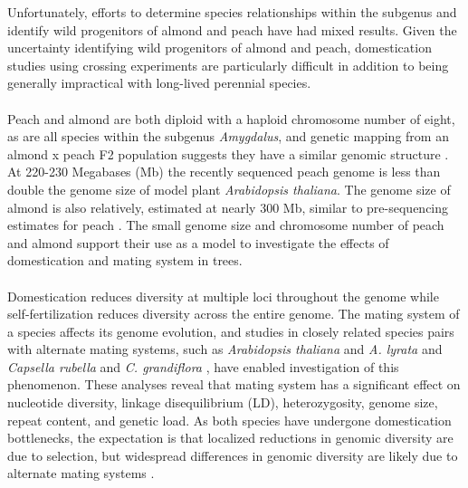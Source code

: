 \documentclass[12pt]{article}
\begin{document}
%
Unfortunately, efforts to determine species relationships within the subgenus and identify wild progenitors of almond and peach \citep{verde2013high, aradhya2004molecular, zeinalabedini2010origin, mowrey1990isozyme, browicz1996genus, ladizinsky1999origin, bassi20081} have had mixed results. 
%
Given the uncertainty identifying wild progenitors of almond and peach, domestication studies using crossing experiments are particularly difficult in addition to being generally impractical with long-lived perennial species.
%
\\
\\
Peach and almond are both diploid with a haploid chromosome number of eight, as are all species within the subgenus \emph{Amygdalus}, and genetic mapping from an almond x peach F2 population suggests they have a similar genomic structure \citep{dirlewanger2004comparative}. 
%
At 220-230 Megabases (Mb) the recently sequenced peach genome \citep{verde2013high} is less than double the genome size of model plant \emph{Arabidopsis thaliana}.
%
The genome size of almond is also relatively, estimated at  nearly 300 Mb, similar to pre-sequencing estimates for peach \citep{arumuganathan1991nuclear}. 
%
The small genome size and chromosome number of peach and almond support their use as a model to investigate the effects of domestication and mating system in trees.
%
\\
\\
Domestication reduces diversity at multiple loci throughout the genome \citep{glemin2006impact, doebley2006molecular, slotte2013capsella} while self-fertilization reduces diversity across the entire genome.
%
The mating system of a species affects its genome evolution, and studies in closely related species pairs with alternate mating systems, such as \emph{Arabidopsis thaliana} and \emph{A. lyrata} and \emph{Capsella rubella} and \emph{C. grandiflora} \citep{slotte2013capsella}, have enabled investigation of this phenomenon. 
%
These analyses reveal that mating system has a significant effect on nucleotide diversity, linkage disequilibrium (LD), heterozygosity, genome size, repeat content, and genetic load. 
%
As both species have undergone domestication bottlenecks, the expectation is that localized reductions in genomic diversity are due to selection, but widespread differences in genomic diversity are likely due to alternate mating systems \citep{glemin2006impact, charlesworth2001breeding}. 
\end{document}
